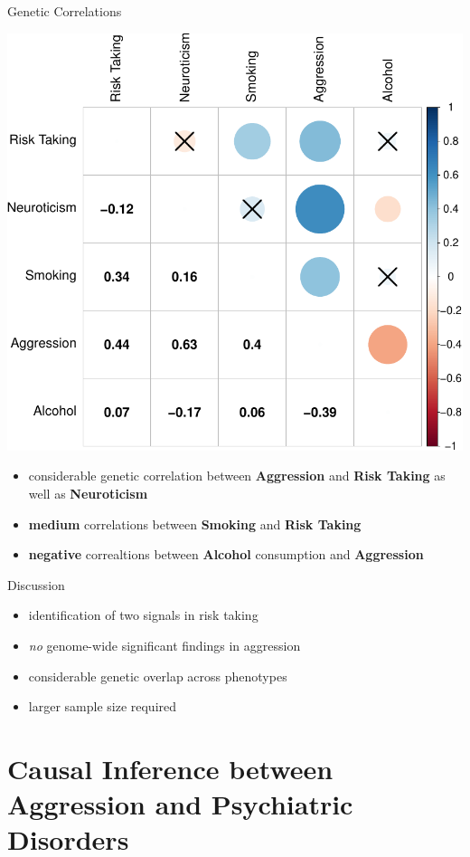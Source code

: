 \documentclass{beamer}
\begin{document}
  \begin{frame}[t]{Genetic Correlations}
    \tiny
    \begin{center}
      \includegraphics[width=0.6\linewidth]{../ukb_assoc/figure/genetic_corr/gcorr_plot_circle_full_se.pdf}
    \end{center}
  \begin{itemize}
    \item considerable genetic correlation between \textbf{Aggression} and \textbf{Risk Taking} as well as \textbf{Neuroticism}
    \item \textbf{medium} correlations between \textbf{Smoking} and \textbf{Risk Taking}
    \item \textbf{negative} correaltions between \textbf{Alcohol} consumption and \textbf{Aggression}
  \end{itemize}
  \end{frame}

  \begin{frame}[t]{Discussion}
    \begin{itemize}
      \item identification of two signals in risk taking
      \item \textit{no} genome-wide significant findings in aggression
      \item considerable genetic overlap across phenotypes
      \item larger sample size required
    \end{itemize} 
  \end{frame}

  \section{Causal Inference between Aggression and Psychiatric Disorders}
\end{document}
